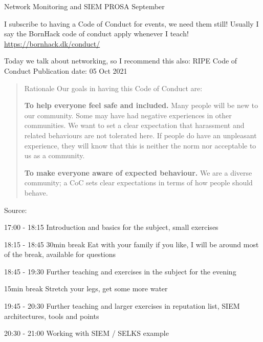 \documentclass[Screen16to9,17pt]{foils}
\begin{document}
\mytitlepage
{Network Monitoring and SIEM}
{PROSA September \the\year{}}


\hlkprofiluk



I subscribe to having a Code of Conduct for events, we need them still! Usually I say the BornHack code of conduct apply whenever I teach! \url{https://bornhack.dk/conduct/}

Today we talk about networking, so I recommend this also:
RIPE Code of Conduct
Publication date: 05 Oct 2021

\begin{quote}
Rationale
Our goals in having this Code of Conduct are:
\begin{list2}
\item {\bf To help everyone feel safe and included.} Many people will be new to our community. Some may have had negative experiences in other communities. We want to set a clear expectation that harassment and related behaviours are not tolerated here. If people do have an unpleasant experience, they will know that this is neither the norm nor acceptable to us as a community.

\item {\bf To make everyone aware of expected behaviour.} We are a diverse community; a CoC sets clear expectations in terms of how people should behave.
\end{list2}
\end{quote}
Source: {\small
{}}


\begin{list2}
\item 17:00 - 18:15 Introduction and basics for the subject,
small exercises

\item 18:15 - 18:45 30min break Eat with your family if you like, I will be around most of the break, available for questions

\item 18:45 - 19:30 Further teaching and exercises in the subject for the evening

\item 15min break Stretch your legs, get some more water

\item 19:45 - 20:30
Further teaching and larger exercises in reputation list, SIEM architectures, tools and points

\item 20:30 - 21:00 Working with SIEM / SELKS example

\end{list2}
\end{document}
